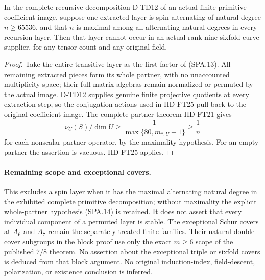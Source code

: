 \begin{corollary}[HD-FT26]
In the complete recursive decomposition D-TD12 of an actual finite
primitive coefficient image, suppose one extracted layer is spin
alternating of natural degree $n\ge65536$, and that $n$ is maximal
among all alternating natural degrees in every recursion layer.
Then that layer cannot occur in an actual rank-nine sixfold curve
supplier, for any tensor count and any original field.
\end{corollary}

\begin{proof}
Take the entire transitive layer as the first factor of (SPA.13).
All remaining extracted pieces form its whole partner, with no
unaccounted multiplicity space; their full matrix algebras remain
normalized or permuted by the actual image.  D-TD12 supplies
genuine finite projective quotients at every extraction step, so
the conjugation actions used in HD-FT25 pull back to the original
coefficient image.  The complete partner theorem HD-FT21 gives
\[
 \nu_U(S)/\dim U\ge
 \frac1{\max\{80,m_{*,U}-1\}}\ge\frac1n
 \tag{SPA.20}
\]
for each nonscalar partner operator, by the maximality hypothesis.
For an empty partner the assertion is vacuous.  HD-FT25 applies.
\end{proof}

\paragraph{Remaining scope and exceptional covers.}
This excludes a spin layer when it has the maximal alternating
natural degree in the exhibited complete primitive decomposition;
without maximality the explicit whole-partner hypothesis (SPA.14)
is retained.  It does not assert that every individual component
of a permuted layer is stable.  The exceptional Schur covers at
$A_6$ and $A_7$ remain the separately treated finite families.
Their natural double-cover subgroups in the block proof use only
the exact $m\ge6$ scope of the published $7/8$ theorem.  No
assertion about the exceptional triple or sixfold covers is
deduced from that block argument.  No original induction-index,
field-descent, polarization, or existence conclusion is inferred.
